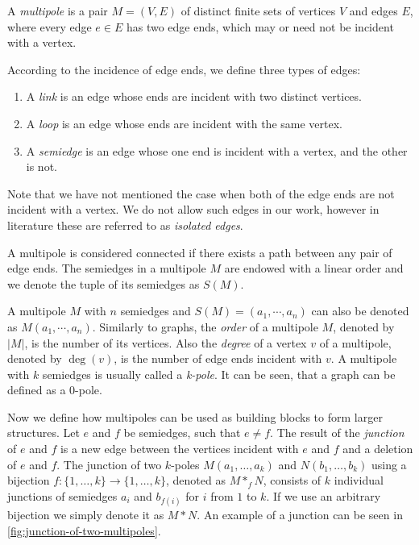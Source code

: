 \documentclass[12pt, twoside]{book}
\begin{document}
\begin{definition}
	A \textit{multipole} is a pair $M=(V,E)$ of distinct finite sets of vertices $V$ and edges $E$, where every edge $e\in E$ has two edge ends, which may or need not be incident with a vertex.
	
	According to the incidence of edge ends, we define three types of edges:
	\begin{enumerate}[nolistsep]
		\item A \textit{link} is an edge whose ends are incident with two distinct vertices.
		\item A \textit{loop} is an edge whose ends are incident with the same vertex.
		\item A \textit{semiedge} is an edge whose one end is incident with a vertex, and the other is not.
	\end{enumerate}
\end{definition}

Note that we have not mentioned the case when both of the edge ends are not incident with a vertex. We do not allow such edges in our work, however in literature these are referred to as \textit{isolated edges}.

A multipole is considered connected if there exists a path between any pair of edge ends. The semiedges in a multipole $M$ are endowed with a linear order and we denote the tuple of its semiedges as $S(M)$.

A multipole $M$ with $n$ semiedges and $S(M) = (a_1, \cdots, a_n)$ can also be denoted as $M(a_1,\cdots,a_n)$. Similarly to graphs, the \textit{order} of a multipole $M$, denoted by $|M|$, is the number of its vertices. Also the \textit{degree} of a vertex $v$ of a multipole, denoted by $\deg(v)$, is the number of edge ends incident with $v$. A multipole with $k$ semiedges is usually called a \textit{k-pole}. It can be seen, that a graph can be defined as a 0-pole.

Now we define how multipoles can be used as building blocks to form larger structures. Let $e$ and $f$ be semiedges, such that $e\neq f$. The result of the \textit{junction} of $e$ and $f$ is a new edge between the vertices incident with $e$ and $f$ and a deletion of $e$ and $f$. The junction of two $k$-poles $M(a_1,\dots,a_k)$ and $N(b_1,\dots,b_k)$ using a bijection ${f:\{1,\dots,k\}\rightarrow\{1,\dots,k\}}$, denoted as $M*_fN$, consists of $k$ individual junctions of semiedges $a_i$ and $b_{f(i)}$ for $i$ from $1$ to $k$. If we use an arbitrary bijection we simply denote it as $M*N$. An example of a junction can be seen in \cref{fig:junction-of-two-multipoles}.
\end{document}
